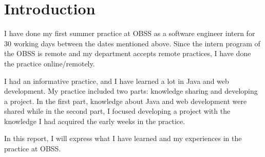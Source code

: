 \section{Introduction}

I have done my first summer practice at OBSS as a software engineer intern for 30 working days between the dates mentioned above. Since the intern program of the OBSS is remote and my department accepts remote practices, I have done the practice online/remotely.

I had an informative practice, and I have learned a lot in Java and web development. My practice included two parts: knowledge sharing and developing a project. In the first part, knowledge about Java and web development were shared while in the second part, I focused developing a project with the knowledge I had acquired the early weeks in the practice.

In this report, I will express what I have learned and my experiences in the practice at OBSS.
